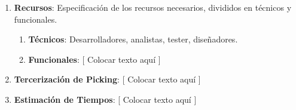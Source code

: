 \documentclass{article}
\begin{document}
\begin{enumerate}
			\begin{enumerate}[label*=\arabic*.]

				\item \textbf{Recursos}: Especificación de los recursos necesarios, divididos en técnicos y funcionales.

					\begin{enumerate}[label*=\arabic*.]
						\itemsep=3pt \topsep=0pt \partopsep=0pt \parskip=0pt \parsep=0pt

						\item \textbf{Técnicos}: Desarrolladores, analistas, tester, diseñadores.

						\item \textbf{Funcionales}: [ Colocar texto aquí ]

					\end{enumerate}
			
				\item \textbf{Tercerización de Picking}: [ Colocar texto aquí ]

				\item \textbf{Estimación de Tiempos}: [ Colocar texto aquí ]

			\end{enumerate}

	\end{enumerate}
	\medskip

\bigskip







\end{document}
